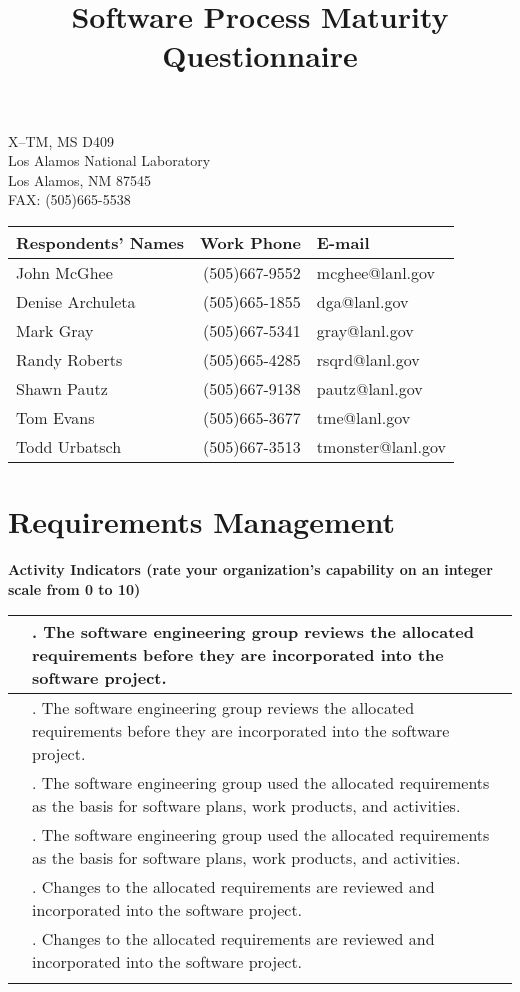 \documentclass{article}
\title{Software Process Maturity Questionnaire}
\newcommand{\KPAname}{}
\let\KPAsection=\section
\renewcommand{\section}[1]{\renewcommand{\KPAname}{#1}\KPAsection{#1}}
\newcounter{activity}[section]		%
\newcounter{approach}[section]
\newcounter{deployment}[section]
\newcounter{result}[section]
\newcounter{NA}[section]
\newcounter{score}
\newenvironment{KPAActivity}
{
    {\bf Activity Indicators (rate your organization's capability
    on an integer scale from 0 to 10)} %
    \begin{center}
    \begin{tabular}{|p{0.5in}|p{6.0in}|} \hline %
}
{
    \end{tabular}
    \end{center}
    \setcounter{approach}{\value{approach}/(\value{activity}-\value{NA})}
    \setcounter{deployment}{\value{deployment}/(\value{activity}-\value{NA})}
    \setcounter{result}{\value{result}/(\value{activity}-\value{NA})}
}
\newcommand{\Activity}[4]
{
    \stepcounter{activity}
    \ifthenelse{\equal{N}{#1}}
    {
	\stepcounter{NA}
	N/A & \arabic{activity}. #4 \\ \hline
    }{
        \setcounter{score}{(#1+#2+#3)/3}
        \setcounter{approach}{\value{approach}+#1}
        \setcounter{deployment}{\value{deployment}+#2}
        \setcounter{result}{\value{result}+#3}
        \arabic{score} & \arabic{activity}. #4 \\ \hline
    }
} %
\begin{document}
\maketitle
\begin{center}
\parbox{35ex}{X--TM, MS D409\\
Los Alamos National Laboratory\\
Los Alamos, NM 87545\\
FAX: (505)665-5538\\}

\begin{tabular}{|l|r|l|} \hline
{\bf Respondents' Names} & {\bf Work Phone} & {\bf E-mail} \\ \hline
John McGhee              & (505)667-9552    & mcghee@lanl.gov \\
Denise Archuleta         & (505)665-1855    & dga@lanl.gov \\
Mark Gray                & (505)667-5341    & gray@lanl.gov \\
Randy Roberts            & (505)665-4285    & rsqrd@lanl.gov \\
Shawn Pautz              & (505)667-9138    & pautz@lanl.gov \\
Tom Evans                & (505)665-3677    & tme@lanl.gov \\
Todd Urbatsch            & (505)667-3513    & tmonster@lanl.gov \\ \hline
\end{tabular}
\end{center}

\newpage
\section{Requirements Management}

\begin{KPAActivity}
\Activity{3}{3}{3}{The software engineering group reviews the allocated
requirements before they are incorporated into the software project.}
\Activity{3}{3}{3}{The software engineering group used the allocated
requirements as the basis for software plans, work products, and
activities.}
\Activity{3}{3}{3}{Changes to the allocated requirements are reviewed and
incorporated into the software project.}
\end{KPAActivity}
\end{document}
